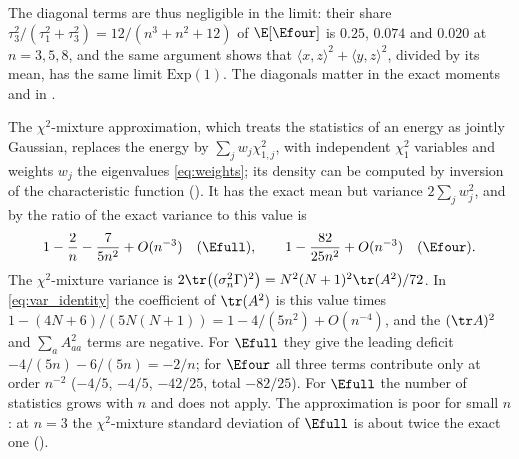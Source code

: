 The diagonal terms are thus negligible in the limit: their share $\tau_3^2/(\tau_1^2+\tau_3^2)=12/(n^3+n^2+12)$ of $\E[\Efour]$ is $0.25$, $0.074$ and $0.020$ at $n=3,5,8$, and the same argument shows that $\langle x,z\rangle^2+\langle y,z\rangle^2$, divided by its mean, has the same limit $\mathrm{Exp}(1)$.
The diagonals matter in the exact moments and in .

\begin{remark}
\label{rem:gauss_mixture}
The $\chi^2$-mixture approximation, which treats the statistics of an energy as jointly Gaussian, replaces the energy by $\sum_jw_j\chi^2_{1,j}$, with independent $\chi^2_1$ variables and weights $w_j$ the eigenvalues \eqref{eq:weights}; its density can be computed by inversion of the characteristic function \cite{imhof1961} ().
It has the exact mean but variance $2\sum_jw_j^2$, and by  the ratio of the exact variance to this value is
\[
1-\frac2n-\frac{7}{5n^2}+O(n^{-3})\quad(\Efull),\qquad 1-\frac{82}{25n^2}+O(n^{-3})\quad(\Efour).
\]
The $\chi^2$-mixture variance is $2\tr\bigl((\sigma_n^2\Gamma)^2\bigr)=N^2(N+1)^2\tr(A^2)/72$.
In \eqref{eq:var_identity} the coefficient of $\tr(A^2)$ is this value times $1-(4N+6)/(5N(N+1))=1-4/(5n^2)+O(n^{-4})$, and the $(\tr A)^2$ and $\sum_aA_{aa}^2$ terms are negative.
For $\Efull$ they give the leading deficit $-4/(5n)-6/(5n)=-2/n$; for $\Efour$ all three terms contribute only at order $n^{-2}$ ($-4/5$, $-4/5$, $-42/25$, total $-82/25$).
For $\Efull$ the number of statistics grows with $n$ and  does not apply.
The approximation is poor for small $n$: at $n=3$ the $\chi^2$-mixture standard deviation of $\Efull$ is about twice the exact one ().
\end{remark}


